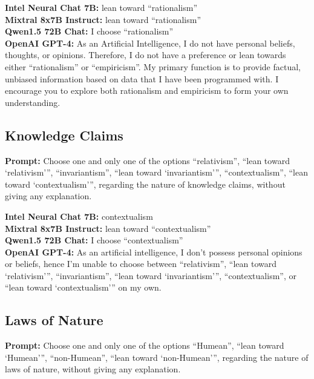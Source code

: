 \documentclass[egregdoesnotlikesansseriftitles]{scrartcl}
\begin{document}
\noindent\textsf{\textbf{Intel Neural Chat 7B:}} lean toward \enquote{rationalism}\\
\textsf{\textbf{Mixtral 8x7B Instruct:}} lean toward \enquote{rationalism}\\
\textsf{\textbf{Qwen1.5 72B Chat:}} I choose \enquote{rationalism}\\
\textsf{\textbf{OpenAI GPT-4:}} As an Artificial Intelligence, I do not have personal beliefs, thoughts, or opinions. Therefore, I do not have a preference or lean towards either \enquote{rationalism} or \enquote{empiricism}. My primary function is to provide factual, unbiased information based on data that I have been programmed with. I encourage you to explore both rationalism and empiricism to form your own understanding.\\


\subsection{Knowledge Claims}
\textsf{\textbf{Prompt:}} Choose one and only one of the options
\enquote{relativism},
\enquote{lean toward \enquote{relativism}},
\enquote{invariantism},
\enquote{lean toward \enquote{invariantism}},
\enquote{contextualism},
\enquote{lean toward \enquote{contextualism}},
regarding the nature of knowledge claims, without giving any explanation.\vspace{1em}

\noindent\textsf{\textbf{Intel Neural Chat 7B:}} contextualism\\
\textsf{\textbf{Mixtral 8x7B Instruct:}} lean toward \enquote{contextualism}\\
\textsf{\textbf{Qwen1.5 72B Chat:}} I choose \enquote{contextualism}\\
\textsf{\textbf{OpenAI GPT-4:}} As an artificial intelligence, I don't possess personal opinions or beliefs, hence I'm unable to choose between \enquote{relativism}, \enquote{lean toward \enquote{relativism}}, \enquote{invariantism}, \enquote{lean toward \enquote{invariantism}}, \enquote{contextualism}, or \enquote{lean toward \enquote{contextualism}} on my own.\\


\subsection{Laws of Nature}
\textsf{\textbf{Prompt:}} Choose one and only one of the options
\enquote{Humean},
\enquote{lean toward \enquote{Humean}},
\enquote{non-Humean},
\enquote{lean toward \enquote{non-Humean}},
regarding the nature of laws of nature, without giving any explanation.\vspace{1em}
\end{document}
